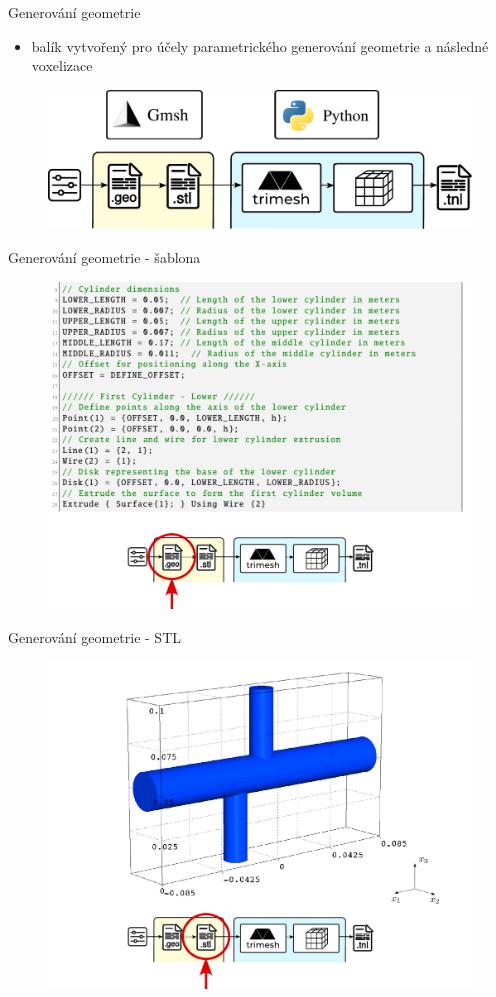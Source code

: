 \documentclass[aspectratio=169,xcolor=dvipsnames]{beamer}
\begin{document}
\begin{frame}{Generování geometrie}
	\begin{itemize}
		\item balík vytvořený pro účely parametrického generování geometrie a následné voxelizace
	\end{itemize}
	\begin{figure}
		\includegraphics[width=0.8\linewidth, trim={0 -0.1cm 0 0}, clip]{Images/meshgen.pdf}
	\end{figure}
\end{frame}
\begin{frame}{Generování geometrie - šablona}
	\begin{figure}
		\includegraphics[width=0.6\linewidth, trim={0 -0.1cm 0 0}, clip]{Images/meshgen-1.pdf}
	\end{figure}
\end{frame}
\begin{frame}{Generování geometrie - STL}
	\begin{figure}
		\includegraphics[width=0.6\linewidth, trim={0 -0.1cm 0 0}, clip]{Images/meshgen-2.pdf}
	\end{figure}
\end{frame}
\end{document}
